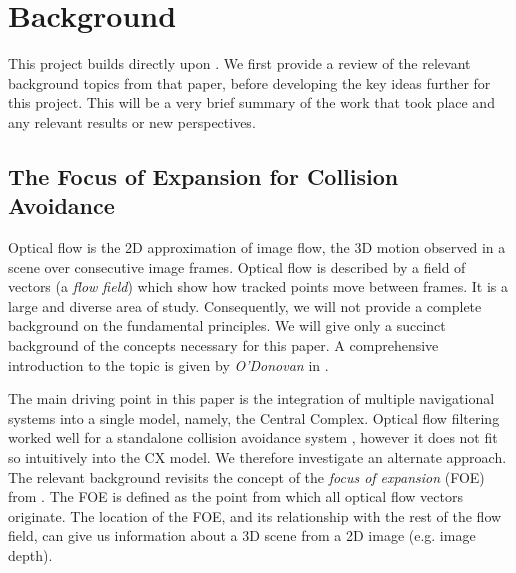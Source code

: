 \documentclass[a4paper,11pt,twoside,openright]{article}
\let\oldsection\section
\def\section{\cleardoublepage\oldsection}
\begin{document}
\section{ Background }
This project builds directly upon \cite{Mitchell2018}. We first provide a review
of the relevant background topics from that paper, before developing the key
ideas further for this project. This will be a very brief summary of the work
that took place and any relevant results or new perspectives.


\subsection{ The Focus of Expansion for Collision Avoidance } \label{OFBackground}
Optical flow is the 2D approximation of image flow, the 3D motion
observed in a scene over consecutive image frames. Optical flow is
described by a field of vectors (a \textit{flow field}) which show how
tracked points move between frames. It is a large and
diverse area of study.  Consequently, we will not provide a complete
background on the fundamental principles. We will give only a succinct
background of the concepts necessary for this paper. A comprehensive
introduction to the topic is given by \textit{O'Donovan} in
\cite{ODonovan2005}.
\newline
\par

The main driving point in this paper is the integration of multiple
navigational systems into a single model, namely, the Central Complex.
Optical flow filtering worked well for a standalone collision
avoidance system \cite{Stewart2010, Mitchell2018}, however it does not
fit so intuitively into the CX model. We therefore investigate an
alternate approach. The relevant background revisits the concept of
the \textit{focus of expansion} (FOE) from \cite{Mitchell2018,
  ODonovan2005}.  The FOE is defined as the point from which all
optical flow vectors originate. The location of the FOE, and its
relationship with the rest of the flow field, can give us information
about a 3D scene from a 2D image (e.g. image depth)\cite{ODonovan2005,
  Souhila2007}.
\newline
\par
\end{document}

